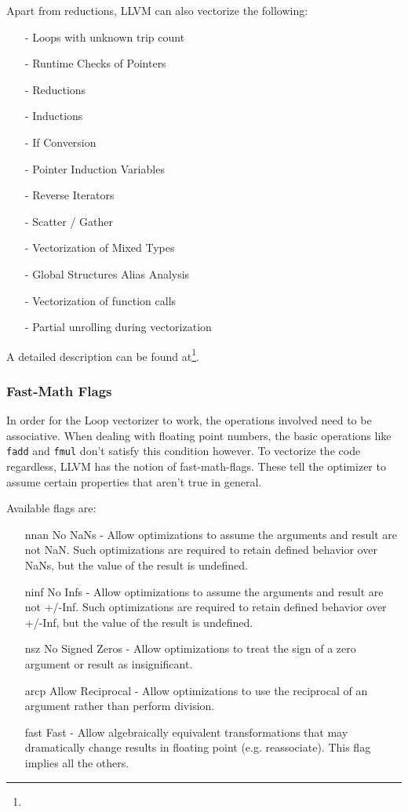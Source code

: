 \documentclass[a4paper,bibliography=totocnumbered,parskip,headsepline]{scrbook}
\begin{document}
Apart from reductions, LLVM can also vectorize the following:
\begin{itemize}[noitemsep]
 \item[-] Loops with unknown trip count
 \item[-] Runtime Checks of Pointers
 \item[-] Reductions
 \item[-] Inductions
 \item[-] If Conversion
 \item[-] Pointer Induction Variables
 \item[-] Reverse Iterators
 \item[-] Scatter / Gather
 \item[-] Vectorization of Mixed Types
 \item[-] Global Structures Alias Analysis
 \item[-] Vectorization of function calls
 \item[-] Partial unrolling during vectorization
\end{itemize}
A detailed description can be found at\footnote{}.

\subsubsection{Fast-Math Flags}
In order for the Loop vectorizer to work, the operations involved need to be associative.
When dealing with floating point numbers, the basic operations like \lstinline{fadd} and \lstinline{fmul} don't satisfy this condition however.
To vectorize the code regardless, LLVM has the notion of fast-math-flags\cite{llvmref}.
These tell the optimizer to assume certain properties that aren't true in general.

Available flags are:
\begin{itemize}[noitemsep]
\item[nnan] No NaNs - Allow optimizations to assume the arguments and result are not NaN. Such optimizations are required to retain defined behavior over NaNs, but the value of the result is undefined.
\item[ninf] No Infs - Allow optimizations to assume the arguments and result are not +/-Inf. Such optimizations are required to retain defined behavior over +/-Inf, but the value of the result is undefined.
\item[nsz] No Signed Zeros - Allow optimizations to treat the sign of a zero argument or result as insignificant.
\item[arcp] Allow Reciprocal - Allow optimizations to use the reciprocal of an argument rather than perform division.
\item[fast] Fast - Allow algebraically equivalent transformations that may dramatically change results in floating point (e.g. reassociate). This flag implies all the others.
\end{itemize}
\end{document}
